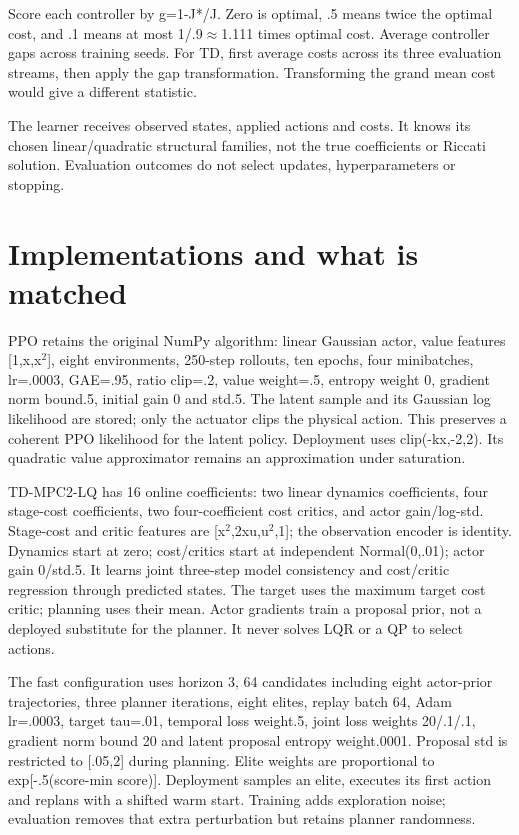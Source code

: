\documentclass[11pt]{article}
\begin{document}
Score each controller by g=1-J*/J. Zero is optimal, .5 means twice the optimal cost, and .1 means at most 1/.9$\approx$1.111 times optimal cost. Average controller gaps across training seeds. For TD, first average costs across its three evaluation streams, then apply the gap transformation. Transforming the grand mean cost would give a different statistic.

The learner receives observed states, applied actions and costs. It knows its chosen linear/quadratic structural families, not the true coefficients or Riccati solution. Evaluation outcomes do not select updates, hyperparameters or stopping.

\section{Implementations and what is matched}

PPO retains the original NumPy algorithm: linear Gaussian actor, value features [1,x,x$^2$], eight environments, 250-step rollouts, ten epochs, four minibatches, lr=.0003, GAE=.95, ratio clip=.2, value weight=.5, entropy weight 0, gradient norm bound.5, initial gain 0 and std.5. The latent sample and its Gaussian log likelihood are stored; only the actuator clips the physical action. This preserves a coherent PPO likelihood for the latent policy. Deployment uses clip(-kx,-2,2). Its quadratic value approximator remains an approximation under saturation.

TD-MPC2-LQ has 16 online coefficients: two linear dynamics coefficients, four stage-cost coefficients, two four-coefficient cost critics, and actor gain/log-std. Stage-cost and critic features are [x$^2$,2xu,u$^2$,1]; the observation encoder is identity. Dynamics start at zero; cost/critics start at independent Normal(0,.01); actor gain 0/std.5. It learns joint three-step model consistency and cost/critic regression through predicted states. The target uses the maximum target cost critic; planning uses their mean. Actor gradients train a proposal prior, not a deployed substitute for the planner. It never solves LQR or a QP to select actions.

The fast configuration uses horizon 3, 64 candidates including eight actor-prior trajectories, three planner iterations, eight elites, replay batch 64, Adam lr=.0003, target tau=.01, temporal loss weight.5, joint loss weights 20/.1/.1, gradient norm bound 20 and latent proposal entropy weight.0001. Proposal std is restricted to [.05,2] during planning. Elite weights are proportional to exp[-.5(score-min score)]. Deployment samples an elite, executes its first action and replans with a shifted warm start. Training adds exploration noise; evaluation removes that extra perturbation but retains planner randomness.
\end{document}
